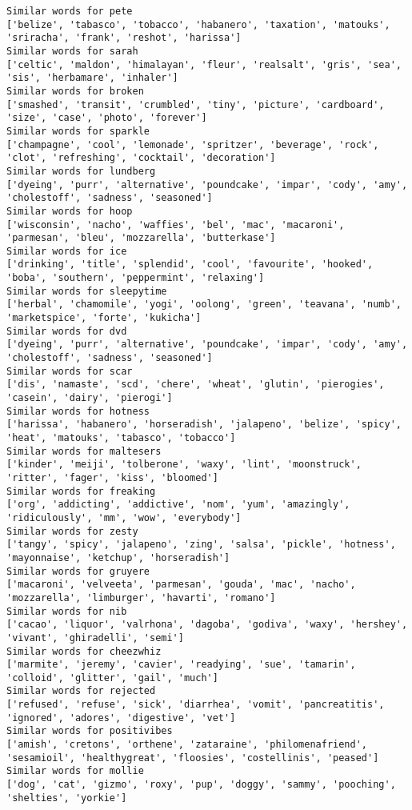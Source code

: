 \documentclass[11pt]{article}
\begin{document}
\begin{Verbatim}[commandchars=\\\{\}]
Similar words for pete
['belize', 'tabasco', 'tobacco', 'habanero', 'taxation', 'matouks', 'sriracha', 'frank', 'reshot', 'harissa']
Similar words for sarah
['celtic', 'maldon', 'himalayan', 'fleur', 'realsalt', 'gris', 'sea', 'sis', 'herbamare', 'inhaler']
Similar words for broken
['smashed', 'transit', 'crumbled', 'tiny', 'picture', 'cardboard', 'size', 'case', 'photo', 'forever']
Similar words for sparkle
['champagne', 'cool', 'lemonade', 'spritzer', 'beverage', 'rock', 'clot', 'refreshing', 'cocktail', 'decoration']
Similar words for lundberg
['dyeing', 'purr', 'alternative', 'poundcake', 'impar', 'cody', 'amy', 'cholestoff', 'sadness', 'seasoned']
Similar words for hoop
['wisconsin', 'nacho', 'waffies', 'bel', 'mac', 'macaroni', 'parmesan', 'bleu', 'mozzarella', 'butterkase']
Similar words for ice
['drinking', 'title', 'splendid', 'cool', 'favourite', 'hooked', 'boba', 'southern', 'peppermint', 'relaxing']
Similar words for sleepytime
['herbal', 'chamomile', 'yogi', 'oolong', 'green', 'teavana', 'numb', 'marketspice', 'forte', 'kukicha']
Similar words for dvd
['dyeing', 'purr', 'alternative', 'poundcake', 'impar', 'cody', 'amy', 'cholestoff', 'sadness', 'seasoned']
Similar words for scar
['dis', 'namaste', 'scd', 'chere', 'wheat', 'glutin', 'pierogies', 'casein', 'dairy', 'pierogi']
Similar words for hotness
['harissa', 'habanero', 'horseradish', 'jalapeno', 'belize', 'spicy', 'heat', 'matouks', 'tabasco', 'tobacco']
Similar words for maltesers
['kinder', 'meiji', 'tolberone', 'waxy', 'lint', 'moonstruck', 'ritter', 'fager', 'kiss', 'bloomed']
Similar words for freaking
['org', 'addicting', 'addictive', 'nom', 'yum', 'amazingly', 'ridiculously', 'mm', 'wow', 'everybody']
Similar words for zesty
['tangy', 'spicy', 'jalapeno', 'zing', 'salsa', 'pickle', 'hotness', 'mayonnaise', 'ketchup', 'horseradish']
Similar words for gruyere
['macaroni', 'velveeta', 'parmesan', 'gouda', 'mac', 'nacho', 'mozzarella', 'limburger', 'havarti', 'romano']
Similar words for nib
['cacao', 'liquor', 'valrhona', 'dagoba', 'godiva', 'waxy', 'hershey', 'vivant', 'ghiradelli', 'semi']
Similar words for cheezwhiz
['marmite', 'jeremy', 'cavier', 'readying', 'sue', 'tamarin', 'colloid', 'glitter', 'gail', 'much']
Similar words for rejected
['refused', 'refuse', 'sick', 'diarrhea', 'vomit', 'pancreatitis', 'ignored', 'adores', 'digestive', 'vet']
Similar words for positivibes
['amish', 'cretons', 'orthene', 'zataraine', 'philomenafriend', 'sesamioil', 'healthygreat', 'floosies', 'costellinis', 'peased']
Similar words for mollie
['dog', 'cat', 'gizmo', 'roxy', 'pup', 'doggy', 'sammy', 'pooching', 'shelties', 'yorkie']

\end{Verbatim}
\end{document}

